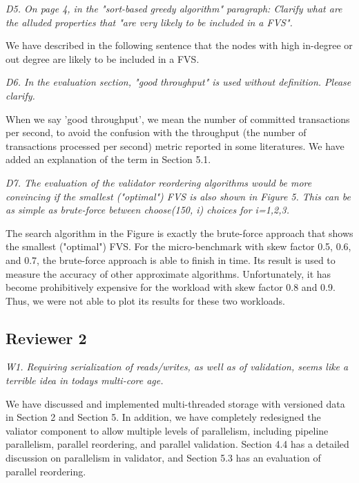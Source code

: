\documentclass{article}
\begin{document}
\bigskip

\emph{D5. On page 4, in the "sort-based greedy algorithm" paragraph: Clarify what are the alluded properties that "are very likely to be included in a FVS".}

\bigskip

We have described in the following sentence that the nodes with high in-degree or out degree are likely to be included in a FVS.

\bigskip
\emph{D6. In the evaluation section, "good throughput" is used without definition. Please clarify.}

\bigskip
When we say 'good throughput', we mean the number of committed transactions per second, to avoid the confusion with the throughput (the number of transactions processed per second) metric reported in some literatures. We have added an explanation of the term in Section 5.1.  

\bigskip
\emph{D7. The evaluation of the validator reordering algorithms would be more convincing if the smallest ("optimal") FVS is also shown in Figure 5. This can be as simple as brute-force between choose(150, i) choices for i=1,2,3.}

\bigskip

The search algorithm in the Figure is exactly the brute-force approach that shows the smallest ("optimal") FVS. For the micro-benchmark with skew factor 0.5, 0.6, and 0.7, the brute-force approach is able to finish in time. Its result is used to measure the accuracy of other approximate algorithms. Unfortunately, it has become prohibitively expensive for the workload with skew factor 0.8 and 0.9. Thus, we were not able to plot its results for these two workloads.
\bigskip

\subsection{Reviewer 2}

\emph{W1. Requiring serialization of reads/writes, as well as of validation, seems like a terrible idea in todays multi-core age. }

\bigskip
We have discussed and implemented multi-threaded storage with versioned data in Section 2 and Section 5. In addition, we have completely redesigned the valiator component to allow multiple levels of parallelism, including pipeline parallelism, parallel reordering, and parallel validation. Section 4.4 has a detailed discussion on parallelism in validator, and Section 5.3 has an evaluation of parallel reordering.
\end{document}
